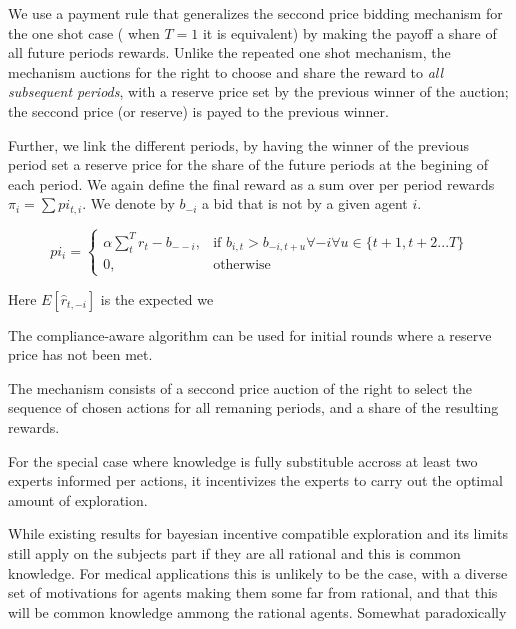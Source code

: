 
We use a payment rule that generalizes the seccond price bidding mechanism for the one shot case ( when $T=1$ it is equivalent) by making the payoff a share of all future periods rewards.  Unlike the repeated one shot mechanism, the mechanism auctions for the right to choose and  share the reward to \emph{all subsequent periods}, with a reserve price set by the previous winner of the auction; the seccond price (or reserve) is payed to the previous winner.  

Further, we link the different periods, by having the winner of the previous period set a reserve price for the share of the future periods at the begining of each period. We again define the final reward as a sum over per period rewards $\pi_i = \sum pi_{t,i}$. We denote by $b_{-i}$ a bid that is not by a given agent $i$. 

\[
pi_{i} =
\begin{cases}
    \alpha \sum_t^T r_t - b_{--i}, & \text{if } b_{i,t} > b_{-i,t+u} \forall -i \forall u \in \{t+1,t+2...T\}\\
    0,              & \text{otherwise}
\end{cases}
\]


Here $E[\hat{r}_{t,-i}]$ is the expected we


The compliance-aware algorithm can be used for initial rounds where a reserve price has not been met.



The mechanism consists of a seccond price auction of the right to select the sequence of chosen actions for all remaning periods, and a share of the resulting rewards.

For the special case where knowledge is  fully substituble accross at least two experts informed per actions, it incentivizes the experts to carry out the optimal amount of exploration. 

While existing results for bayesian incentive compatible exploration and its limits still apply on the subjects part if they are all rational and this is common knowledge. For medical applications this is unlikely to be the case, with a diverse set of motivations for agents making them some far from rational, and that this will be common knowledge ammong the rational agents. Somewhat paradoxically 

